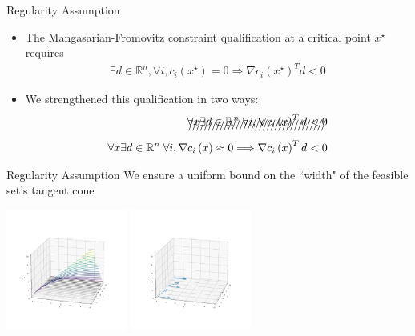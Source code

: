 \documentclass{beamer}
\newcommand{\Rn}{\mathbb R ^ {n}}
\begin{document}
\begin{frame}{Regularity Assumption}
\begin{itemize}
\item The Mangasarian-Fromovitz constraint qualification at a critical point $x^{\star}$ requires
\begin{align*}
\exists d \in \Rn, \forall i, c_i\left(x^{\star}\right)=0 \Longrightarrow \nabla c_i\left(x^{\star}\right)^T d < 0 
\end{align*}
\item We strengthened this qualification in two ways:
\begin{align*}
\xout{\forall x \exists d \in \Rn\; \forall i, \nabla c_i\left(x\right)^T d < 0} \\
\forall x \exists d \in \Rn\; \forall i, \nabla c_i\left(x\right) \approx 0 \Longrightarrow \nabla c_i\left(x\right)^T d < 0 \\
\end{align*}
\end{itemize}
\end{frame}

\begin{frame}{Regularity Assumption}
	We ensure a uniform bound on the ``width" of the feasible set's tangent cone
	\begin{center}
		\includegraphics[width=150px]{images/decreasing_regularity.png}
		\includegraphics[width=150px]{images/decreasing_regularity_2.png}
	\end{center}
\end{frame}
\end{document}
